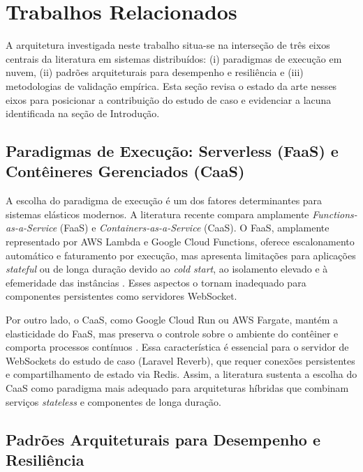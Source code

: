 \section{Trabalhos Relacionados}
\label{sec:relacionados}

A arquitetura investigada neste trabalho situa-se na interseção de três eixos centrais da literatura em sistemas distribuídos:
(i) paradigmas de execução em nuvem,
(ii) padrões arquiteturais para desempenho e resiliência e
(iii) metodologias de validação empírica.
Esta seção revisa o estado da arte nesses eixos para posicionar a contribuição do estudo de caso e evidenciar a lacuna identificada na seção de Introdução.

\subsection{Paradigmas de Execução: Serverless (FaaS) e Contêineres Gerenciados (CaaS)}
\label{sec:paradigmas}

A escolha do paradigma de execução é um dos fatores determinantes para sistemas elásticos modernos.
A literatura recente compara amplamente \textit{Functions-as-a-Service} (FaaS)
e \textit{Containers-as-a-Service} (CaaS). O FaaS, amplamente representado por AWS Lambda
e Google Cloud Functions, oferece escalonamento automático e faturamento por execução,
mas apresenta limitações para aplicações \textit{stateful} ou de longa duração devido
ao \textit{cold start}, ao isolamento elevado e à efemeridade das instâncias
\cite{sonawane_serverless_review_2024, datadog_serverless_containers_2024}.
Esses aspectos o tornam inadequado para componentes persistentes como servidores WebSocket.

Por outro lado, o CaaS, como Google Cloud Run ou AWS Fargate,
mantém a elasticidade do FaaS, mas preserva o controle sobre o ambiente do contêiner
e comporta processos contínuos \cite{lloyd_serverless_investigation_2018}.
Essa característica é essencial para o servidor de WebSockets do estudo de caso
(Laravel Reverb), que requer conexões persistentes e compartilhamento de estado via Redis.
Assim, a literatura sustenta a escolha do CaaS como paradigma mais adequado para
arquiteturas híbridas que combinam serviços \textit{stateless} e componentes de longa duração.

\subsection{Padrões Arquiteturais para Desempenho e Resiliência}
\label{sec:padroes}

